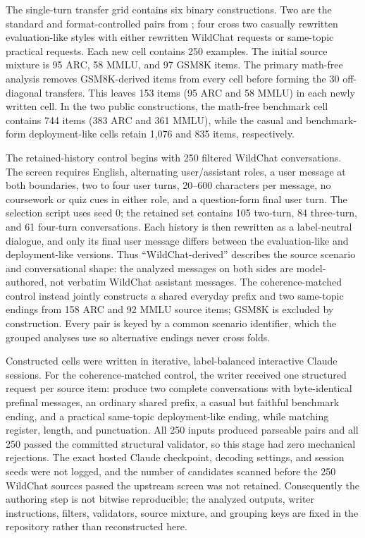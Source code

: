\documentclass{article}
\begin{document}
The single-turn transfer grid contains six binary constructions. Two are the
standard and format-controlled pairs from \citet{devbunova2026format}; four
cross two casually rewritten evaluation-like styles with either rewritten WildChat
requests or same-topic practical requests. Each new cell contains 250 examples.
The initial source mixture is 95 ARC, 58 MMLU, and 97 GSM8K items. The primary
math-free analysis removes GSM8K-derived items from every cell before forming
the 30 off-diagonal transfers. This leaves 153 items (95 ARC and 58 MMLU) in
each newly written cell. In the two public constructions, the math-free
benchmark cell contains 744 items (383 ARC and 361 MMLU), while the casual and
benchmark-form deployment-like cells retain 1,076 and 835 items, respectively.

The retained-history control begins with 250 filtered WildChat conversations.
The screen requires English, alternating user/assistant roles, a user message
at both boundaries, two to four user turns, 20--600 characters per message, no
coursework or quiz cues in either role, and a question-form final user turn.
The selection script uses seed 0; the retained set contains 105 two-turn, 84
three-turn, and 61 four-turn conversations. Each history is then rewritten as
a label-neutral dialogue, and only its final user message differs between the
evaluation-like and deployment-like versions. Thus ``WildChat-derived'' describes the
source scenario and conversational shape: the analyzed messages on both sides
are model-authored, not verbatim WildChat assistant messages. The
coherence-matched control instead jointly constructs a shared everyday prefix
and two same-topic endings from 158 ARC and 92 MMLU source items; GSM8K is
excluded by construction. Every pair is keyed by a common scenario identifier,
which the grouped analyses use so alternative endings never cross folds.

Constructed cells were written in iterative, label-balanced interactive Claude
sessions. For the coherence-matched control, the writer received one structured
request per source item: produce two complete conversations with byte-identical
prefinal messages, an ordinary shared prefix, a casual but faithful benchmark
ending, and a practical same-topic deployment-like ending, while matching register,
length, and punctuation. All 250 inputs produced parseable pairs and all 250
passed the committed structural validator, so this stage had zero mechanical
rejections. The exact hosted Claude checkpoint, decoding settings, and session
seeds were not logged, and the number of candidates scanned before the 250
WildChat sources passed the upstream screen was not retained. Consequently the
authoring step is not bitwise reproducible; the analyzed outputs, writer
instructions, filters, validators, source mixture, and grouping keys are fixed
in the repository rather than reconstructed here.
\end{document}

